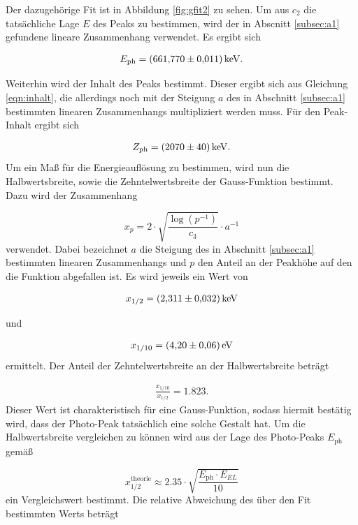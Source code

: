 Der dazugehörige Fit ist in Abbildung \ref{fig:gfit2} zu sehen. Um aus $c_{2}$ die tatsächliche Lage $E$
des Peaks zu bestimmen, wird der in Abscnitt \ref{subsec:a1} gefundene lineare Zusammenhang verwendet.
Es ergibt sich

\begin{align*}
  E_{\text{ph}} = \SI{661.770+-0.011}{\kilo\electronvolt}.
\end{align*}

Weiterhin wird der Inhalt des Peaks bestimmt. Dieser ergibt sich aus Gleichung \eqref{eqn:inhalt}, die allerdings
noch mit der Steigung $a$ des in Abschnitt \ref{subsec:a1} bestimmten linearen Zusammenhangs multipliziert werden muss.
Für den Peak-Inhalt ergibt sich

\begin{align*}
  Z_\text{ph} = \SI{2070+-40}{\kilo\electronvolt}.
\end{align*}
Um ein Maß für die Energieauflösung zu bestimmen, wird nun die Halbwertsbreite, sowie die Zehntelwertsbreite
der Gauss-Funktion bestimmt.
Dazu wird der Zusammenhang

\begin{equation}
  \label{eqn:halbwertsbreite}
  x_{p} = 2 \cdot \sqrt{\frac{\log\left( p^{-1} \right)}{c_{3}}} \cdot a^{-1}
\end{equation}
verwendet. Dabei bezeichnet $a$ die Steigung des in Abschnitt \ref{subsec:a1} bestimmten linearen Zusammenhangs und
$p$ den Anteil an der Peakhöhe auf den die Funktion abgefallen ist.
Es wird jeweils ein Wert von

\begin{align*}
  x_{1/2} = \SI{2.311+-0.032}{\kilo\electronvolt}
\end{align*}

und

\begin{align*}
  x_{1/10} = \SI{4.2+-0.06}{\electronvolt}
\end{align*}
ermittelt.
Der Anteil der Zehntelwertsbreite an der Halbwertsbreite beträgt

\begin{align*}
  \frac{x_{1/10}}{x_{1/2}} = \SI{1.823}.
\end{align*}
Dieser Wert ist charakteristisch für eine Gauss-Funktion, sodass hiermit bestätig wird, dass der Photo-Peak tatsächlich
eine solche Gestalt hat.
Um die Halbwertsbreite vergleichen zu können wird aus der Lage des Photo-Peaks $E_{\text{ph}}$  gemäß

\begin{equation}
    \label{eqn:halbwerttheorie}
    x_{1/2}^{\text{theorie}} \approx 2.35 \cdot \sqrt{\frac{E_\text{ph} \cdot E_{EL}}{10}}
\end{equation}
ein Vergleichswert bestimmt. Die relative Abweichung des über den Fit bestimmten Werts beträgt

